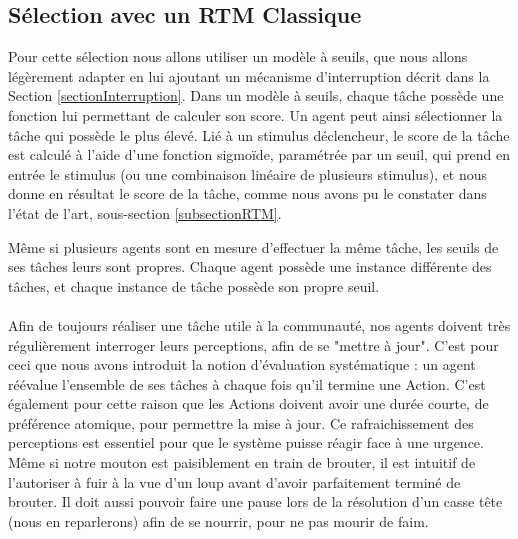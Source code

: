 		\subsection{Sélection avec un RTM Classique}
			Pour cette sélection nous allons utiliser un modèle à seuils, que nous allons légèrement adapter en lui ajoutant un mécanisme d'interruption décrit dans la Section \ref{sectionInterruption}. Dans un modèle à seuils, chaque tâche possède une fonction lui permettant de calculer son score. Un agent peut ainsi sélectionner la tâche qui possède le plus élevé. Lié à un stimulus déclencheur, le score de la tâche est calculé à l'aide d'une fonction sigmoïde, paramétrée par un seuil, qui prend en entrée le stimulus (ou une combinaison linéaire de plusieurs stimulus), et nous donne en résultat le score de la tâche, comme nous avons pu le constater dans l'état de l'art, sous-section \ref{subsectionRTM}.
			
			Même si plusieurs agents sont en mesure d'effectuer la même tâche, les seuils de ses tâches leurs sont propres. Chaque agent possède une instance différente des tâches, et chaque instance de tâche possède son propre seuil. 
			
			\paragraph{}
			Afin de toujours réaliser une tâche utile à la communauté, nos agents doivent très régulièrement interroger leurs perceptions, afin de se "mettre à jour". C'est pour ceci que nous avons introduit la notion d'évaluation systématique : un agent réévalue l'ensemble de ses tâches à chaque fois qu'il termine une Action. C'est également pour cette raison que les Actions doivent avoir une durée courte, de préférence atomique, pour permettre la mise à jour. Ce rafraichissement des perceptions est essentiel pour que le système puisse réagir face à une urgence. Même si notre mouton est paisiblement en train de brouter, il est intuitif de l'autoriser à fuir à la vue d'un loup avant d'avoir parfaitement terminé de brouter. Il doit aussi pouvoir faire une pause lors de la résolution d'un casse tête (nous en reparlerons) afin de se nourrir, pour ne pas mourir de faim.
		

